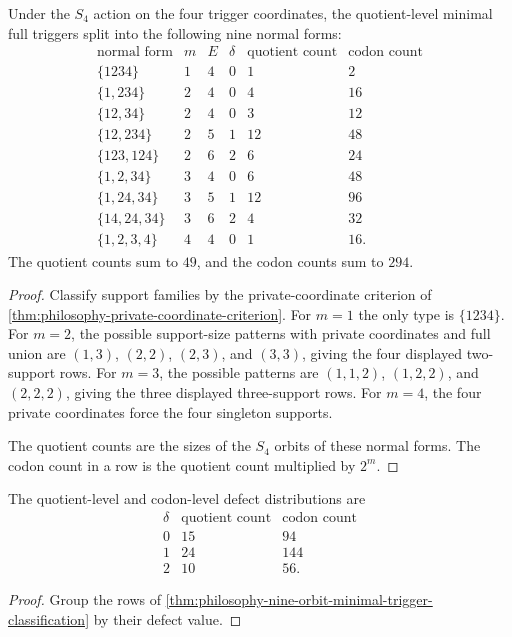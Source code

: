 \begin{theorem}
\label{thm:philosophy-nine-orbit-minimal-trigger-classification}
Under the $S_{4}$ action on the four trigger coordinates, the
quotient-level minimal full triggers split into the following nine
normal forms:
$$
\begin{array}{c|c|r|r|r|r}
  \text{normal form} & m & E & \delta & \text{quotient count} & \text{codon count}\\
  \hline
  \{1234\} & 1 & 4 & 0 & 1 & 2\\
  \{1,234\} & 2 & 4 & 0 & 4 & 16\\
  \{12,34\} & 2 & 4 & 0 & 3 & 12\\
  \{12,234\} & 2 & 5 & 1 & 12 & 48\\
  \{123,124\} & 2 & 6 & 2 & 6 & 24\\
  \{1,2,34\} & 3 & 4 & 0 & 6 & 48\\
  \{1,24,34\} & 3 & 5 & 1 & 12 & 96\\
  \{14,24,34\} & 3 & 6 & 2 & 4 & 32\\
  \{1,2,3,4\} & 4 & 4 & 0 & 1 & 16.
\end{array}
$$
The quotient counts sum to $49$, and the codon counts sum to $294$.
\end{theorem}
\begin{proof}
Classify support families by the private-coordinate criterion of
\autoref{thm:philosophy-private-coordinate-criterion}. For $m=1$ the
only type is $\{1234\}$. For $m=2$, the possible support-size patterns
with private coordinates and full union are $(1,3)$, $(2,2)$, $(2,3)$,
and $(3,3)$, giving the four displayed two-support rows. For $m=3$,
the possible patterns are $(1,1,2)$, $(1,2,2)$, and $(2,2,2)$, giving
the three displayed three-support rows. For $m=4$, the four private
coordinates force the four singleton supports.

The quotient counts are the sizes of the $S_{4}$ orbits of these normal
forms. The codon count in a row is the quotient count multiplied by
$2^{m}$.
\end{proof}

\begin{corollary}
\label{cor:philosophy-minimal-trigger-defect-distribution}
The quotient-level and codon-level defect distributions are
$$
\begin{array}{c|r|r}
  \delta & \text{quotient count} & \text{codon count}\\
  \hline
  0 & 15 & 94\\
  1 & 24 & 144\\
  2 & 10 & 56.
\end{array}
$$
\end{corollary}
\begin{proof}
Group the rows of
\autoref{thm:philosophy-nine-orbit-minimal-trigger-classification} by
their defect value.
\end{proof}


